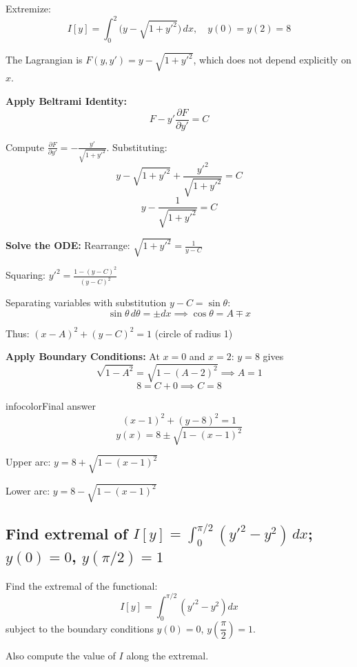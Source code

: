 \documentclass[a4paper,11pt]{article} %
\newenvironment{summarybox}[1][]{\begin{custombox}[#1]{infocolor}{Final answer}}{\end{custombox}}
\begin{document}
\begin{problembox}
Extremize:
$$I[y]=\int_{0}^{2}\Big( y-\sqrt{1+y'^2}\Big)\,dx, \quad y(0)=y(2)=8$$
\end{problembox}

The Lagrangian is $F(y, y') = y - \sqrt{1+y'^2}$, which does not depend explicitly on $x$.

\textbf{Apply Beltrami Identity:}
$$F - y'\frac{\partial F}{\partial y'} = C$$

Compute $\displaystyle\frac{\partial F}{\partial y'} = -\frac{y'}{\sqrt{1+y'^2}}$. Substituting:
$$y - \sqrt{1+y'^2} + \frac{y'^2}{\sqrt{1+y'^2}} = C$$
$$y - \frac{1}{\sqrt{1+y'^2}} = C$$

\textbf{Solve the ODE:}
Rearrange: $\displaystyle\sqrt{1+y'^2} = \frac{1}{y-C}$

Squaring: $\displaystyle y'^2 = \frac{1-(y-C)^2}{(y-C)^2}$

Separating variables with substitution $y - C = \sin\theta$:
$$\sin\theta \, d\theta = \pm dx \implies \cos\theta = A \mp x$$

Thus: $\displaystyle(x-A)^2 + (y-C)^2 = 1$ (circle of radius 1)

\textbf{Apply Boundary Conditions:}
At $x=0$ and $x=2$: $y = 8$ gives
$$\sqrt{1-A^2} = \sqrt{1-(A-2)^2} \implies A = 1$$
$$8 = C + 0 \implies C = 8$$

\begin{summarybox}
$$(x-1)^2 + (y-8)^2 = 1$$
$$y(x) = 8 \pm \sqrt{1-(x-1)^2}$$

Upper arc: $y = 8 + \sqrt{1-(x-1)^2}$

Lower arc: $y = 8 - \sqrt{1-(x-1)^2}$
\end{summarybox}

\newpage
\subsection{\texorpdfstring{Find extremal of $I[y]=\int_0^{\pi/2}(y'^2-y^2)\,dx$; $y(0)=0$, $y(\pi/2)=1$}{CoV: Euler-Lagrange gives $y''+y=0$; general solution is trigonometric; unique extremal $y=\sin x$}}

\begin{problembox}
Find the extremal of the functional:
$$I[y] = \int_0^{\pi/2}\!\left(y'^2 - y^2\right)dx$$
subject to the boundary conditions $y(0) = 0$, $y\!\left(\dfrac{\pi}{2}\right) = 1$.

Also compute the value of $I$ along the extremal.
\end{problembox}
\end{document}
